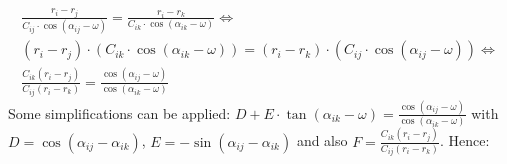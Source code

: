 \documentclass[11pt,a4paper]{article}
\begin{document}
	\begin{equation*}
		\begin{aligned}
			\frac{r_i-r_j}{C_{ij}\cdot\cos(\alpha_{ij}-\omega)}=\frac{r_i-r_k}{C_{ik}\cdot\cos(\alpha_{ik}-\omega)} \Leftrightarrow \\
			(r_i-r_j)\cdot(C_{ik}\cdot\cos(\alpha_{ik}-\omega))=(r_i-r_k)\cdot(C_{ij}\cdot\cos(\alpha_{ij}-\omega)) \Leftrightarrow \\
			\frac{C_{ik}(r_i-r_j)}{C_{ij}(r_i-r_k)}=\frac{\cos(\alpha_{ij}-\omega)}{\cos(\alpha_{ik}-\omega)}
		\end{aligned}
	\end{equation*}\noindent
	Some simplifications can be applied:\newline
	$D+E\cdot\tan(\alpha_{ik}-\omega)=\frac{\cos(\alpha_{ij}-\omega)}{\cos(\alpha_{ik}-\omega)}$ with \newline $D=\cos(\alpha_{ij}-\alpha_{ik})$,  $E=-\sin(\alpha_{ij}-\alpha_{ik})$ and also $F=\frac{C_{ik}(r_i-r_j)}{C_{ij}(r_i-r_k)}$.\newline
	Hence:
	
\end{document}
